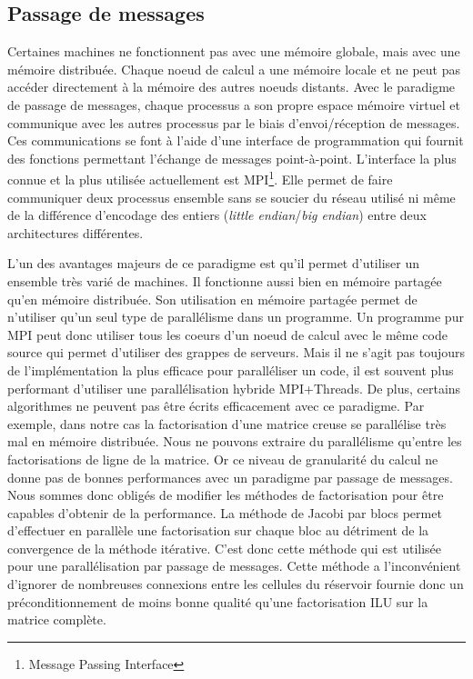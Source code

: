 \subsection{Passage de messages}
Certaines machines ne fonctionnent pas avec une mémoire globale, mais avec une mémoire distribuée.
% 
Chaque noeud de calcul a une mémoire locale et ne peut pas accéder directement à la mémoire des autres noeuds distants.
%
Avec le paradigme de passage de messages, chaque processus a son propre espace mémoire virtuel et communique avec les autres processus par le biais d'envoi/réception de messages.
%
Ces communications se font à l'aide d'une interface de programmation qui fournit des fonctions permettant l'échange de messages point-à-point.
%
L'interface la plus connue et la plus utilisée actuellement est MPI\footnote{Message Passing Interface}.
%
Elle permet de faire communiquer deux processus ensemble sans se soucier du réseau utilisé ni même de la différence d'encodage des entiers ({\em little endian}/{\em big endian}) entre deux architectures différentes.

L'un des avantages majeurs de ce paradigme est qu'il permet d'utiliser un ensemble très varié de machines.
%
Il fonctionne aussi bien en mémoire partagée qu'en mémoire distribuée.
%
Son utilisation en mémoire partagée permet de n'utiliser qu'un seul type de parallélisme dans un programme.
%
Un programme pur MPI peut donc utiliser tous les coeurs d'un noeud de calcul avec le même code source qui permet d'utiliser des grappes de serveurs.
%
Mais il ne s'agit pas toujours de l'implémentation la plus efficace pour paralléliser un code, il est souvent plus performant d'utiliser une parallélisation hybride MPI+Threads\cite{mpi_openmp}.
%
De plus, certains algorithmes ne peuvent pas être écrits efficacement avec ce paradigme.
%
Par exemple, dans notre cas la factorisation d'une matrice creuse se parallélise très mal en mémoire distribuée.
%
Nous ne pouvons extraire du parallélisme qu'entre les factorisations de ligne de la matrice.
%
Or ce niveau de granularité du calcul ne donne pas de bonnes performances avec un paradigme par passage de messages.
%
Nous sommes donc obligés de modifier les méthodes de factorisation pour être capables d'obtenir de la performance.
%
La méthode de Jacobi par blocs permet d'effectuer en parallèle une factorisation sur chaque bloc au détriment de la convergence de la méthode itérative.
%
C'est donc cette méthode qui est utilisée pour une parallélisation par passage de messages.
%
Cette méthode a l'inconvénient d'ignorer de nombreuses connexions entre les cellules du réservoir fournie donc un préconditionnement de moins bonne qualité qu'une factorisation ILU sur la matrice complète.
